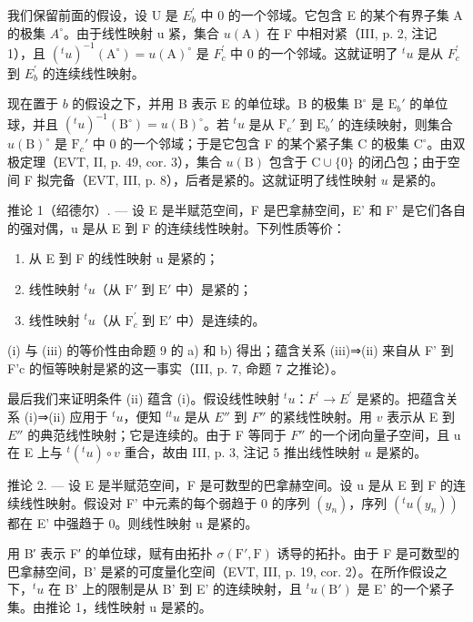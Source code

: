 我们保留前面的假设，设 U 是 \(E_{b}^{\prime}\) 中 0 的一个邻域。它包含 E 的某个有界子集 A 的极集 \(A^{\circ}\)。由于线性映射 u 紧，集合 \(u(\mathrm{A})\) 在 F 中相对紧（III, p. 2, 注记 1），且 \((^{t}u)^{-1}(\mathrm{A}^{\circ}) = u(\mathrm{A})^{\circ}\) 是 \(F_{c}^{\prime}\) 中 0 的一个邻域。这就证明了 \(^{t}u\) 是从 \(F_{c}^{\prime}\) 到 \(E_{b}^{\prime}\) 的连续线性映射。

现在置于 \(b\) 的假设之下，并用 B 表示 E 的单位球。B 的极集 \(\mathrm{B}^{\circ}\) 是 \(\mathrm{E}_b'\) 的单位球，并且 \((^{t}u)^{-1}(\mathrm{B}^{\circ}) = u(\mathrm{B})^{\circ}\)。若 \(^{t}u\) 是从 \(\mathrm{F}_c'\) 到 \(\mathrm{E}_b'\) 的连续映射，则集合 \(u(\mathrm{B})^{\circ}\) 是 \(\mathrm{F}_c'\) 中 0 的一个邻域；于是它包含 F 的某个紧子集 C 的极集 \(\mathrm{C}^{\circ}\)。由双极定理（EVT, II, p. 49, cor. 3），集合 \(u(\mathrm{B})\) 包含于 \(\mathrm{C} \cup \{0\}\) 的闭凸包；由于空间 F 拟完备（EVT, III, p. 8），后者是紧的。这就证明了线性映射 \(u\) 是紧的。

推论 1（绍德尔）. --- 设 E 是半赋范空间，F 是巴拿赫空间，E' 和 F' 是它们各自的强对偶，u 是从 E 到 F 的连续线性映射。下列性质等价：

\begin{enumerate}
\def\labelenumi{(\roman{enumi})}
\item
  从 E 到 F 的线性映射 u 是紧的；
\item
  线性映射 \({}^{t}u\)（从 \(\mathrm{F}'\) 到 \(\mathrm{E}'\) 中）是紧的；
\item
  线性映射 \({}^{t}u\)（从 \(\mathrm{F}_{c}^{\prime}\) 到 \(\mathrm{E}'\) 中）是连续的。
\end{enumerate}

(i) 与 (iii) 的等价性由命题 9 的 a) 和 b) 得出；蕴含关系 (iii)⇒(ii) 来自从 F' 到 F'c 的恒等映射是紧的这一事实（III, p. 7, 命题 7 之推论）。

最后我们来证明条件 (ii) 蕴含 (i)。假设线性映射 \({}^{t}u\)：\(F^{\prime} \to E^{\prime}\) 是紧的。把蕴含关系 (i)⇒(ii) 应用于 \({}^{t}u\)，便知 \({}^{tt}u\) 是从 \(E''\) 到 \(F''\) 的紧线性映射。用 \(v\) 表示从 E 到 \(E''\) 的典范线性映射；它是连续的。由于 F 等同于 \(F''\) 的一个闭向量子空间，且 u 在 E 上与 \({}^{t}({}^{t}u) \circ v\) 重合，故由 III, p. 3, 注记 5 推出线性映射 \(u\) 是紧的。

推论 2. --- 设 E 是半赋范空间，F 是可数型的巴拿赫空间。设 u 是从 E 到 F 的连续线性映射。假设对 F' 中元素的每个弱趋于 0 的序列 \((y_{n})\)，序列 \((^{t}u(y_{n}))\) 都在 E' 中强趋于 0。则线性映射 u 是紧的。

用 B′ 表示 F′ 的单位球，赋有由拓扑 \(\sigma(\mathrm{F}',\mathrm{F})\) 诱导的拓扑。由于 F 是可数型的巴拿赫空间，B' 是紧的可度量化空间（EVT, III, p. 19, cor. 2）。在所作假设之下，\({}^{t}u\) 在 B' 上的限制是从 B' 到 E' 的连续映射，且 \({}^{t}u(\mathrm{B}')\) 是 E' 的一个紧子集。由推论 1，线性映射 u 是紧的。

